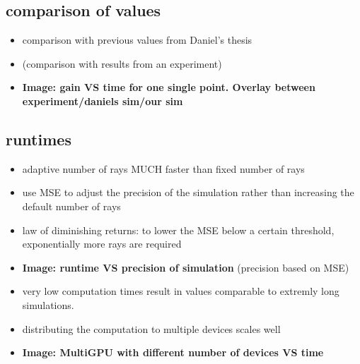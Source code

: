 \documentclass[a4paper,11pt]{article}
\begin{document}
\subsection{comparison of values}
\begin{itemize}
  \item comparison with previous values from Daniel's thesis
  \item (comparison with results from an experiment)
  \item \textbf{Image: gain VS time for one single point. Overlay between experiment/daniels sim/our sim}
\end{itemize}

\subsection{runtimes}
\begin{itemize}
  \item adaptive number of rays MUCH faster than fixed number of rays
  \item use MSE to adjust the precision of the simulation rather than increasing the default number of rays
  \item law of diminishing returns: to lower the MSE below a certain threshold, exponentially more rays are required
  \item \textbf{Image: runtime VS precision of simulation} (precision based on MSE)
  \item very low computation times result in values comparable to extremly long simulations.
  \item distributing the computation to multiple devices scales well
  \item \textbf{Image: MultiGPU with different number of devices VS time}
\end{itemize}
\end{document}

